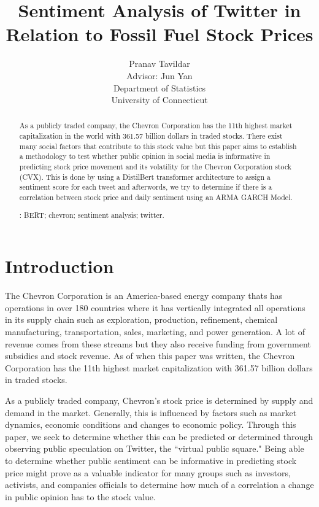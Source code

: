 \documentclass[12pt, letterpaper, titlepage]{article}
\title{Sentiment Analysis of Twitter in Relation to Fossil Fuel Stock Prices}
\author{Pranav Tavildar\\[2ex]
  Advisor: Jun Yan\\[2ex]
  Department of Statistics\\
  University of Connecticut
}
\newcommand{\jy}[1]{\textcolor{blue}{JY: #1}}
\begin{document}
\maketitle
\doublespace

\begin{abstract}
As a publicly traded company, the Chevron Corporation has the 11th highest market capitalization in the world with 361.57 billion dollars in traded stocks. There exist many social factors that contribute to this stock value but this paper aims to establish a methodology to test whether public opinion in social media is informative in predicting stock price movement and its volatility for the Chevron Corporation stock (CVX). This is done by using a DistilBert transformer architecture to assign a sentiment score for each tweet and afterwords, we try to determine if there is a correlation between stock price and daily sentiment using an ARMA GARCH Model.



\bigskip
{}:
BERT;
chevron;
sentiment analysis;
twitter.
\end{abstract}

\section{Introduction}
\label{sec:intro}

The Chevron Corporation is an America-based energy company thats has operations in over 180 countries where it has vertically integrated all operations in its supply chain such as exploration, production, refinement, chemical manufacturing, transportation, sales, marketing, and power generation. A lot of revenue comes from these streams but they also receive funding from government subsidies and stock revenue. As of when this paper was written, the Chevron Corporation has the 11th highest market capitalization with 361.57 billion dollars in traded stocks.

As a publicly traded company, Chevron's stock price is determined by supply and demand in the market. Generally, this is influenced by factors such as market dynamics, economic conditions and changes to economic policy. Through this paper, we seek to determine whether this can be predicted or determined through observing public speculation on Twitter, the ``virtual public square." Being able to determine whether public sentiment can be informative in predicting stock price might prove as a valuable indicator for many groups such as investors, activists, and companies officials to determine how much of a correlation a change in public opinion has to the stock value.  	
\end{document}
